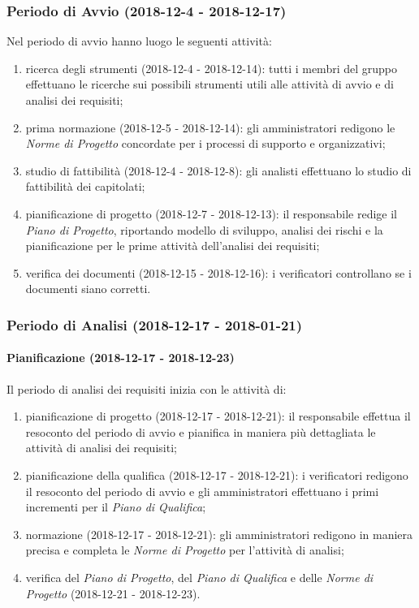 	\subsubsection{Periodo di Avvio (2018-12-4 - 2018-12-17)}
		Nel periodo di avvio hanno luogo le seguenti attività:
		\begin{enumerate}[label = 1.\arabic*)]
			\item ricerca degli strumenti (2018-12-4 - 2018-12-14): tutti i membri del gruppo effettuano le ricerche sui possibili strumenti utili alle attività di avvio e di analisi dei requisiti;
			\item prima normazione (2018-12-5 - 2018-12-14): gli amministratori redigono le \textit{Norme di Progetto} concordate per i processi di supporto e organizzativi;
			\item studio di fattibilità (2018-12-4 - 2018-12-8): gli analisti effettuano lo studio di fattibilità dei capitolati;
			\item pianificazione di progetto (2018-12-7 - 2018-12-13): il responsabile redige il \textit{Piano di Progetto}, riportando modello di sviluppo, analisi dei rischi e la pianificazione per le prime attività dell'analisi dei requisiti;
			\item verifica dei documenti (2018-12-15 - 2018-12-16): i verificatori controllano se i documenti siano corretti.
		\end{enumerate}
		
	\subsubsection{Periodo di Analisi (2018-12-17 - 2018-01-21)}	
		\paragraph{Pianificazione (2018-12-17 - 2018-12-23)\\} Il periodo di analisi dei requisiti inizia con le attività di:
			\begin{enumerate}[label = 2.1.\arabic*)]
				\item pianificazione di progetto (2018-12-17 - 2018-12-21): il responsabile effettua il resoconto del periodo di avvio e pianifica in maniera più dettagliata le attività di analisi dei requisiti; 
				\item pianificazione della qualifica (2018-12-17 - 2018-12-21): i verificatori redigono il resoconto del periodo di avvio e gli amministratori effettuano i primi incrementi per il \textit{Piano di Qualifica};
				\item normazione (2018-12-17 - 2018-12-21): gli amministratori redigono in maniera precisa e completa le \textit{Norme di Progetto} per l'attività di analisi;
				\item verifica del \textit{Piano di Progetto}, del \textit{Piano di Qualifica} e delle \textit{Norme di Progetto} (2018-12-21 - 2018-12-23).
			\end{enumerate}
